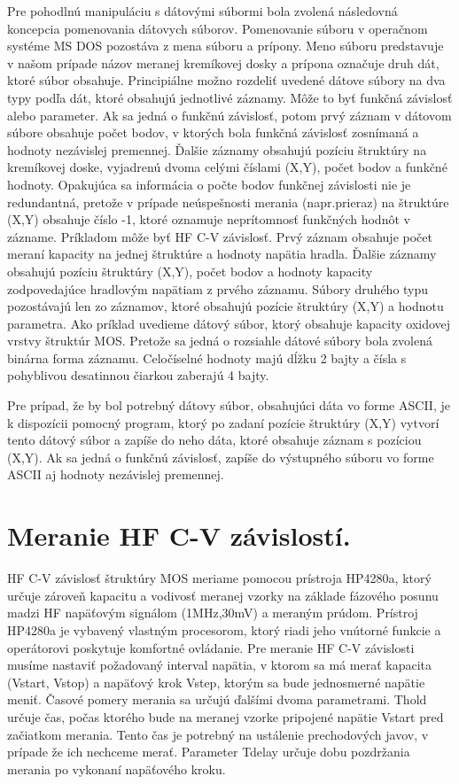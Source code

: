 Pre pohodlnú manipuláciu s dátovými súbormi bola zvolená následovná
koncepcia pomenovania dátovych súborov. Pomenovanie súboru v operačnom
systéme MS DOS pozostáva z mena súboru a prípony.  Meno súboru
predstavuje v našom prípade názov meranej kremíkovej dosky a prípona
označuje druh dát, ktoré súbor obsahuje. Principiálne možno rozdeliť
uvedené dátove súbory na dva typy podľa dát, ktoré obsahujú jednotlivé
záznamy. Môže to byť funkčná závislosť alebo parameter. Ak sa jedná o
funkčnú závislosť, potom prvý záznam v dátovom súbore obsahuje počet
bodov, v ktorých bola funkčná závislosť zosnímaná a hodnoty nezávislej
premennej. Ďalšie záznamy obsahujú pozíciu štruktúry na kremíkovej
doske, vyjadrenú dvoma celými číslami (X,Y), počet bodov a funkčné
hodnoty.  Opakujúca sa informácia o počte bodov funkčnej závislosti
nie je redundantná, pretože v prípade neúspešnosti merania
(napr.prieraz) na štruktúre (X,Y) obsahuje číslo -1, ktoré oznamuje
neprítomnosť funkčných hodnôt v zázname. Príkladom môže byť HF C-V
závislosť. Prvý záznam obsahuje počet meraní kapacity na jednej
štruktúre a hodnoty napätia hradla. Ďalšie záznamy obsahujú pozíciu
štruktúry (X,Y), počet bodov a hodnoty kapacity zodpovedajúce
hradlovým napätiam z prvého záznamu. Súbory druhého typu pozostávajú
len zo záznamov, ktoré obsahujú pozície štruktúry (X,Y) a hodnotu
parametra. Ako príklad uvedieme dátový súbor, ktorý obsahuje kapacity
oxidovej vrstvy štruktúr MOS. Pretože sa jedná o rozsiahle dátové
súbory bola zvolená binárna forma záznamu.  Celočíselné hodnoty majú
dĺžku 2 bajty a čísla s pohyblivou desatinnou čiarkou zaberajú 4
bajty.

Pre prípad, že by bol potrebný dátovy súbor, obsahujúci dáta vo forme
ASCII, je k dispozícii pomocný program, ktorý po zadaní pozície
štruktúry (X,Y) vytvorí tento dátový súbor a zapíše do neho dáta,
ktoré obsahuje záznam s pozíciou (X,Y). Ak sa jedná o funkčnú
závislosť, zapíše do výstupného súboru vo forme ASCII aj hodnoty
nezávislej premennej.

\section{Meranie HF C-V závislostí.}\label{sec:5.1}

HF C-V závislosť štruktúry MOS meriame pomocou prístroja HP4280a,
ktorý určuje zároveň kapacitu a vodivosť meranej vzorky na základe
fázového posunu madzi HF napäťovým signálom (1MHz,30mV) a meraným
prúdom. Prístroj HP4280a je vybavený vlastným procesorom, ktorý riadi
jeho vnútorné funkcie a operátorovi poskytuje komfortné ovládanie. Pre
meranie HF C-V závislosti musíme nastaviť požadovaný interval napätia,
v ktorom sa má merať kapacita (Vstart, Vstop) a napäťový krok Vstep,
ktorým sa bude jednosmerné napätie meniť. Časové pomery merania sa
určujú ďalšími dvoma parametrami. Thold určuje čas, počas ktorého bude
na meranej vzorke pripojené napätie Vstart pred začiatkom
merania. Tento čas je potrebný na ustálenie prechodových javov, v
prípade že ich nechceme merať. Parameter Tdelay určuje dobu pozdržania
merania po vykonaní napäťového kroku.

